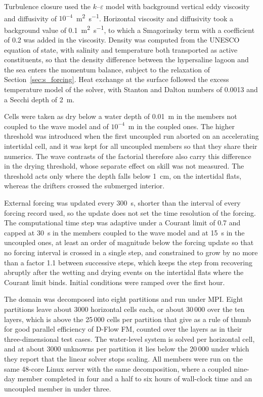 \documentclass[12pt]{article}
\begin{document}
Turbulence closure used the $k$--$\varepsilon$ model with background vertical
eddy viscosity and diffusivity of $10^{-4}$~\si{\metre\squared\per\second}.
Horizontal viscosity and diffusivity took a background value of
0.1~\si{\metre\squared\per\second}, to which a Smagorinsky term with a
coefficient of 0.2 was added in the viscosity. Density was computed from the
UNESCO equation of state, with salinity and temperature both transported as
active constituents, so that the density difference between the hypersaline
lagoon and the sea enters the momentum balance, subject to the relaxation of
Section~\ref{sec:s_forcing}. Heat exchange at the surface followed
the excess temperature model of the solver, with Stanton and Dalton numbers of
0.0013 and a Secchi depth of 2~m.

Cells were taken as dry below a water depth of 0.01~m in the members not
coupled to the wave model and of $10^{-4}$~m in the coupled ones. The higher
threshold was introduced when the first uncoupled run aborted on an
accelerating intertidal cell, and it was kept for all uncoupled members so
that they share their numerics. The wave contrasts of the factorial therefore
also carry this difference in the drying threshold, whose separate effect on
skill was not measured. The threshold acts only where the depth falls below
1~cm, on the intertidal flats, whereas the drifters crossed the submerged
interior.

External forcing was updated every 300~s, shorter than the interval of every
forcing record used, so the update does not set the time resolution of the
forcing. The computational time step was adaptive under a Courant limit of 0.7
and capped at 30~s in the members coupled to the wave model and at 15~s in the
uncoupled ones, at least an order of magnitude below the forcing update so that
no forcing interval is crossed in a single step, and constrained to grow by no
more than a factor 1.1 between successive steps, which keeps the step from
recovering abruptly after the wetting and drying events on the intertidal flats
where the Courant limit binds. Initial conditions were ramped over the first
hour.

The domain was decomposed into eight partitions and run under MPI. Eight
partitions leave about 3000 horizontal cells each, or about 30\,000 over the
ten layers, which is above the 25\,000 cells per partition that
\citet{Moge2019} give as a rule of thumb for good parallel efficiency of D-Flow
FM, counted over the layers as in their three-dimensional test cases. The
water-level system is solved per horizontal cell, and at about 3000 unknowns
per partition it lies below the 20\,000 under which they report that the linear
solver stops scaling. All members were run on the same 48-core Linux server
with the same decomposition, where a coupled nine-day member completed in four
and a half to six hours of wall-clock time and an uncoupled member in under
three.
\end{document}
